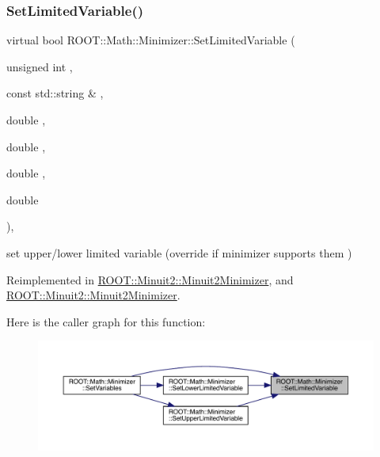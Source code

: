 \subsubsection{\texorpdfstring{SetLimitedVariable()}{SetLimitedVariable()}\hspace{0.1cm}{\footnotesize\ttfamily [1/2]}}
{\footnotesize\ttfamily virtual bool R\+O\+O\+T\+::\+Math\+::\+Minimizer\+::\+Set\+Limited\+Variable (\begin{DoxyParamCaption}\item[{unsigned int}]{,  }\item[{const std\+::string \&}]{,  }\item[{double}]{,  }\item[{double}]{,  }\item[{double}]{,  }\item[{double}]{ }\end{DoxyParamCaption})\hspace{0.3cm}{\ttfamily [inline]}, {\ttfamily [virtual]}}



set upper/lower limited variable (override if minimizer supports them ) 



Reimplemented in \mbox{\hyperlink{classROOT_1_1Minuit2_1_1Minuit2Minimizer_a30385295df6a6b784aa59de7f00e4d23}{R\+O\+O\+T\+::\+Minuit2\+::\+Minuit2\+Minimizer}}, and \mbox{\hyperlink{classROOT_1_1Minuit2_1_1Minuit2Minimizer_a30385295df6a6b784aa59de7f00e4d23}{R\+O\+O\+T\+::\+Minuit2\+::\+Minuit2\+Minimizer}}.

Here is the caller graph for this function\+:\nopagebreak
\begin{figure}[H]
\begin{center}
\leavevmode
\includegraphics[width=350pt]{dc/dc4/classROOT_1_1Math_1_1Minimizer_a4303530cbb62ceb7cf9c9ebcbde530c2_icgraph}
\end{center}
\end{figure}
\mbox{\label{classROOT_1_1Math_1_1Minimizer_a4303530cbb62ceb7cf9c9ebcbde530c2}} 
